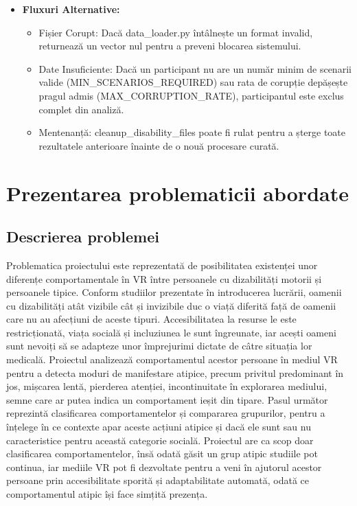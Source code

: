 \documentclass[12pt,a4paper]{report}
\theoremstyle{definition}
\theoremstyle{remark}
\begin{document}
\begin{itemize}
    \item \textbf{Fluxuri Alternative:}
    \begin{itemize}
        \item Fișier Corupt: Dacă data\_loader.py întâlnește un format invalid, returnează un vector nul pentru a preveni blocarea sistemului.
        \item Date Insuficiente: Dacă un participant nu are un număr minim de scenarii valide (MIN\_SCENARIOS\_REQUIRED) sau rata de corupție depășește pragul admis (MAX\_CORRUPTION\_RATE), participantul este exclus complet din analiză.
        \item Mentenanță: cleanup\_disability\_files poate fi rulat pentru a șterge toate rezultatele anterioare înainte de o nouă procesare curată.
    \end{itemize}
\end{itemize}






\chapter{Prezentarea problematicii abordate}

\section{Descrierea problemei}
Problematica proiectului este reprezentată de posibilitatea existenței unor diferențe comportamentale în VR între persoanele cu dizabilități motorii și persoanele tipice. Conform  studiilor prezentate în introducerea lucrării, oamenii cu dizabilități atât vizibile cât și invizibile duc o viață diferită față de oamenii care nu au afecțiuni de aceste tipuri. Accesibilitatea la resurse le este restricționată, viața socială și incluziunea le sunt îngreunate, iar acești oameni sunt nevoiți să se adapteze unor împrejurimi dictate de câtre situația lor medicală. Proiectul analizează comportamentul acestor persoane în mediul VR pentru a detecta moduri de manifestare atipice, precum privitul predominant în jos, mișcarea lentă, pierderea atenției, incontinuitate în explorarea mediului, semne care ar putea indica un comportament ieșit din tipare. Pasul următor reprezintă clasificarea comportamentelor și compararea grupurilor, pentru a înțelege în ce contexte apar aceste acțiuni atipice și dacă ele sunt sau nu caracteristice pentru această categorie socială. Proiectul are ca scop doar clasificarea comportamentelor, însă odată găsit un grup atipic studiile pot continua, iar mediile VR pot fi dezvoltate pentru a veni în ajutorul acestor persoane prin accesibilitate sporită și adaptabilitate automată, odată ce comportamentul atipic își face simțită prezența. 
\end{document}

